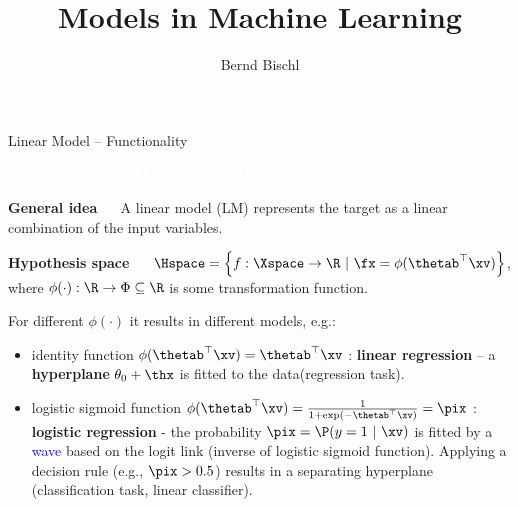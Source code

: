 \documentclass[11pt,compress,t,notes=noshow, xcolor=table]{beamer}
\title{Models in Machine Learning}
\author{Bernd Bischl}
\institute{\href{https://compstat-lmu.github.io/lecture_i2ml/}
{compstat-lmu.github.io/lecture\_i2ml}}
\date{}
\newcommand{\maketag}[1]{\colorbox{highlightcol}{\textcolor{white}
{\MakeUppercase{#1}}}}
\newcommand{\highlight}[1]{\textcolor{highlightcol}{\textbf{#1}}}
\begin{document}










\begin{frame}{Linear Model -- Functionality}

\footnotesize

\maketag{SUPERVISED}
\maketag{PARAMETRIC}
\maketag{WHITE-BOX}


\medskip


\highlight{General idea} ~~  
A linear model (LM) represents the target as a linear combination of the input variables.



\medskip

\highlight{Hypothesis space} ~~
$\Hspace = \left\{f: \Xspace \to \R ~|~\fx = \phi(\thetab^\top \xv)\right\}$, 
where $\phi(\cdot): \R \to \Phi \subseteq \R$ is some transformation function.

\smallskip

For different $\phi(\cdot)$ it results in different models, e.g.: 
\begin{itemize}
  \item identity function $\phi(\thetab^\top \xv) = \thetab^\top \xv$ :  \textbf{linear regression} -- a \textbf{hyperplane} $\theta_0 + \thx$ is fitted to the data(regression task).
  \item logistic sigmoid function $\phi(\thetab^\top \xv) = \frac{1}{1 + \exp(- \thetab^\top \xv)} = \pix$ : \textbf{logistic regression} - the probability $\pix = \P(y = 1 ~|~\xv)$ is fitted by a \textcolor{blue}{wave} based on the logit link (inverse of logistic sigmoid function). Applying a decision rule (e.g., $\pix >0.5$) results in a separating hyperplane (classification task, linear classifier). 


\end{itemize}
\end{frame}
\end{document}
